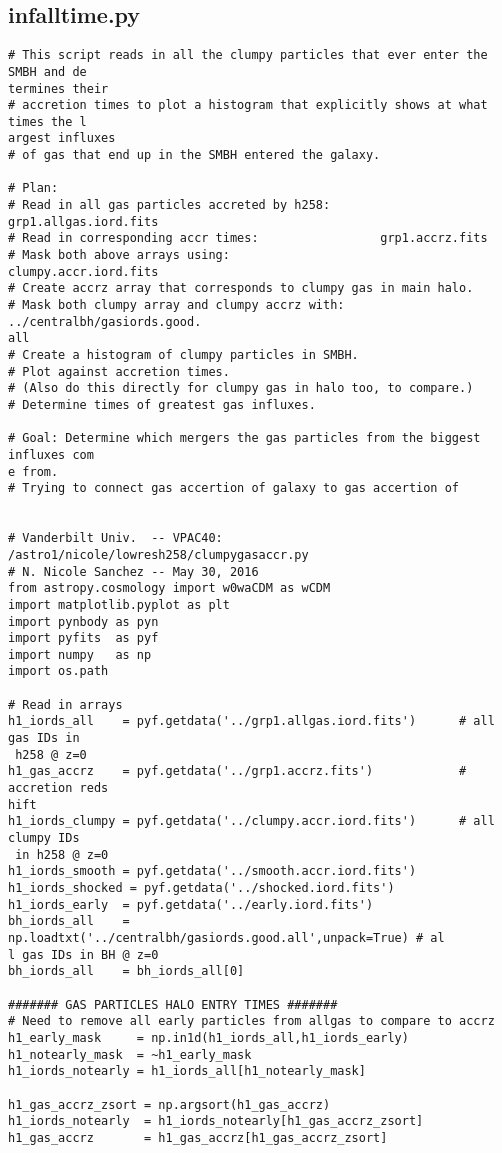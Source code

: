 \documentclass[12pt,headA,chapB]{fiskthesis}
\begin{document}
\subsection{infalltime.py}
\begin{verbatim}
# This script reads in all the clumpy particles that ever enter the SMBH and de
termines their 
# accretion times to plot a histogram that explicitly shows at what times the l
argest influxes
# of gas that end up in the SMBH entered the galaxy.

# Plan:
# Read in all gas particles accreted by h258:       grp1.allgas.iord.fits
# Read in corresponding accr times:                 grp1.accrz.fits
# Mask both above arrays using:                     clumpy.accr.iord.fits
# Create accrz array that corresponds to clumpy gas in main halo.
# Mask both clumpy array and clumpy accrz with:     ../centralbh/gasiords.good.
all
# Create a histogram of clumpy particles in SMBH.
# Plot against accretion times.
# (Also do this directly for clumpy gas in halo too, to compare.)
# Determine times of greatest gas influxes.

# Goal: Determine which mergers the gas particles from the biggest influxes com
e from.
# Trying to connect gas accertion of galaxy to gas accertion of 


# Vanderbilt Univ.  -- VPAC40:  /astro1/nicole/lowresh258/clumpygasaccr.py 
# N. Nicole Sanchez -- May 30, 2016 
from astropy.cosmology import w0waCDM as wCDM
import matplotlib.pyplot as plt
import pynbody as pyn
import pyfits  as pyf
import numpy   as np
import os.path

# Read in arrays
h1_iords_all    = pyf.getdata('../grp1.allgas.iord.fits')      # all gas IDs in
 h258 @ z=0
h1_gas_accrz    = pyf.getdata('../grp1.accrz.fits')            # accretion reds
hift  
h1_iords_clumpy = pyf.getdata('../clumpy.accr.iord.fits')      # all clumpy IDs
 in h258 @ z=0
h1_iords_smooth = pyf.getdata('../smooth.accr.iord.fits')
h1_iords_shocked = pyf.getdata('../shocked.iord.fits')
h1_iords_early  = pyf.getdata('../early.iord.fits') 
bh_iords_all    = np.loadtxt('../centralbh/gasiords.good.all',unpack=True) # al
l gas IDs in BH @ z=0
bh_iords_all    = bh_iords_all[0]

####### GAS PARTICLES HALO ENTRY TIMES #######
# Need to remove all early particles from allgas to compare to accrz
h1_early_mask     = np.in1d(h1_iords_all,h1_iords_early)
h1_notearly_mask  = ~h1_early_mask
h1_iords_notearly = h1_iords_all[h1_notearly_mask]

h1_gas_accrz_zsort = np.argsort(h1_gas_accrz)
h1_iords_notearly  = h1_iords_notearly[h1_gas_accrz_zsort]
h1_gas_accrz       = h1_gas_accrz[h1_gas_accrz_zsort]


\end{verbatim}
\end{document}
